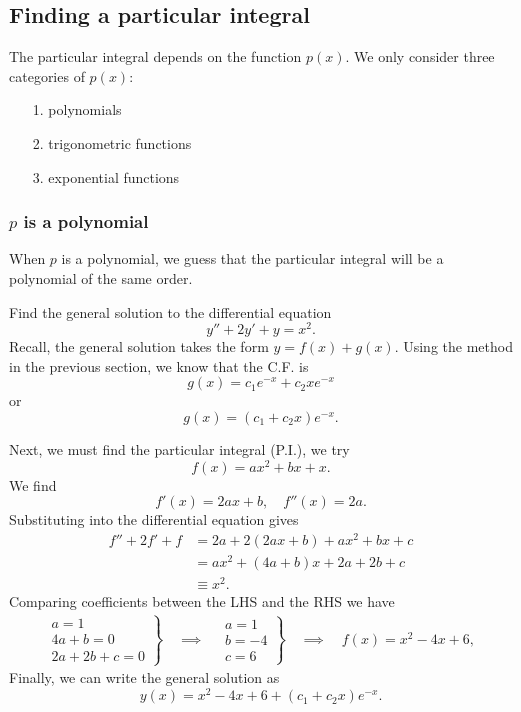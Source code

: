 \subsection{Finding a particular integral}

The particular integral depends on the function $p(x)$. We only consider three categories of $p(x)$:
\begin{itemize}
\item[1.] polynomials
\item[2.] trigonometric functions
\item[3.] exponential functions
\end{itemize}

\subsubsection{$p$ is a polynomial}
When $p$ is a polynomial, we guess that the particular integral will be a polynomial of the same order.

\begin{example} 
Find the general solution to the differential equation
\[y''+2y'+y=x^2.\]
Recall, the general solution takes the form $y=f(x)+g(x)$.
Using the method in the previous section, we know that the C.F. is
\[g(x)=c_1e^{-x}+c_2xe^{-x}\] or \[g(x)=(c_1+c_2x)e^{-x}.\]

Next, we must find the particular integral (P.I.), we try 
\[f(x)=ax^2+bx+x.\]
We find
\[f'(x)=2ax+b,\quad f''(x)=2a.\]
Substituting into the differential equation gives
\begin{align*}
f''+2f'+f &= 2a+2(2ax+b)+ax^2+bx+c \\
&= ax^2 +(4a+b)x +2a +2b+ c \\
&\equiv x^2.
\end{align*}
Comparing coefficients between the LHS and the RHS we have
\begin{align*}
    \left. \begin{array}{l}
	a=1 \\
	4a+b=0 \\
	2a+2b+c=0
    \end{array}\right\}
    \quad \implies \quad
        \left. \begin{array}{l}
	a=1 \\
	b=-4 \\
	c=6
    \end{array}\right\} 
    \quad\implies \quad f(x)=x^2-4x+6,
\end{align*}
Finally, we can write the general solution as
\[y(x)=x^2-4x+6+(c_1+c_2x)e^{-x}.\]
\end{example}

